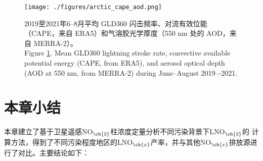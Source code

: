 \begin{figure}[H]
\centering
\texttt{[image: ./figures/arctic\_cape\_aod.png]}
\caption{
2019至2021年6--8月平均 GLD360 闪击频率、对流有效位能（CAPE，来自 ERA5）和气溶胶光学厚度（550 nm 处的 AOD，来自 MERRA-2）。\\
Figure \ref{fig:arctic_cape_aod}.
Mean GLD360 lightning stroke rate, convective available potential energy (CAPE, from ERA5), and aerosol optical depth (AOD at 550 nm, from MERRA-2) during June--August 2019–-2021.
}
\label{fig:arctic_cape_aod}
\end{figure}



\section{本章小结}

本章建立了基于卫星遥感NO$_{\ch{2}}$柱浓度定量分析不同污染背景下LNO$_{\ch{2}}$的
计算方法，得到了不同污染程度地区的LNO$_{\ch{x}}$产率，并与其他NO$_{\ch{x}}$排放源进行了对比。主要结论如下：

